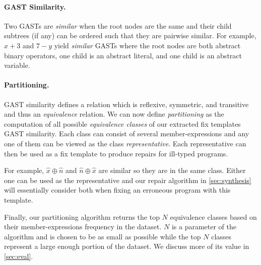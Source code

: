 

\paragraph{GAST Similarity.}
Two GASTs are \emph{similar} when
the root nodes are the same and their child subtrees (if any) can be ordered
such that they are pairwise similar. For example, $x + 3$ and $7 - y$ yield
\emph{similar} GASTs where the root nodes are both abstract binary operators,
one child is an abstract literal, and one child is an abstract variable.

\paragraph{Partitioning.}
GAST similarity defines a relation which is reflexive, symmetric, and transitive
and thus an \emph{equivalence} relation. We can now define \emph{partitioning}
as the computation of all possible \emph{equivalence classes} of our extracted
fix templates \wrt GAST similarity. Each class can consist of several
member-expressions and any one of them can be viewed as the class
\emph{representative}. Each representative can then be used as a fix template to
produce repairs for ill-typed programs.

For example, $\hat{x} \oplus \hat{n}$ and $\hat{n} \oplus \hat{x}$ are similar
so they are in the same class. Either one can be used as the representative and
our repair algorithm in \autoref{sec:synthesis} will essentially consider both
when fixing an erroneous program with this template.

Finally, our partitioning algorithm returns the top $N$ equivalence classes
based on their member-expressions frequency in the dataset. $N$ is a parameter
of the algorithm and is chosen to be as small as possible while the top $N$
classes represent a large enough portion of the dataset. We discuss more of its
value in \autoref{sec:eval}.
